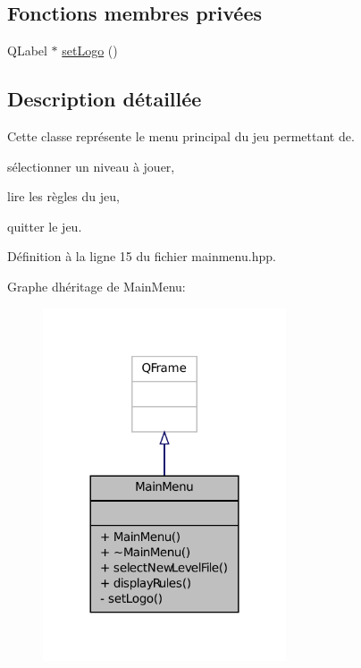 \subsection*{Fonctions membres privées}
\begin{DoxyCompactItemize}
\item 
Q\+Label $\ast$ \hyperlink{classMainMenu_aa3dd35ff0093ab766b10ef6a0d1586a1}{set\+Logo} ()
\end{DoxyCompactItemize}


\subsection{Description détaillée}
Cette classe représente le menu principal du jeu permettant de. 


\begin{DoxyItemize}
\item sélectionner un niveau à jouer,  
\item lire les règles du jeu,  
\item quitter le jeu.  
\end{DoxyItemize}

Définition à la ligne 15 du fichier mainmenu.\+hpp.



Graphe d\textquotesingle{}héritage de Main\+Menu\+:\nopagebreak
\begin{figure}[H]
\begin{center}
\leavevmode
\includegraphics[width=204pt]{db/d55/classMainMenu__inherit__graph}
\end{center}
\end{figure}


